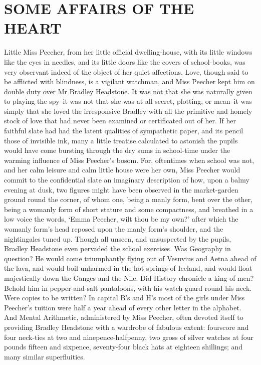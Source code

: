 
\chapter{SOME AFFAIRS OF THE HEART}

Little Miss Peecher, from her little official dwelling-house, with its
little windows like the eyes in needles, and its little doors like the
covers of school-books, was very observant indeed of the object of her
quiet affections. Love, though said to be afflicted with blindness, is
a vigilant watchman, and Miss Peecher kept him on double duty over Mr
Bradley Headstone. It was not that she was naturally given to playing
the spy--it was not that she was at all secret, plotting, or mean--it
was simply that she loved the irresponsive Bradley with all the
primitive and homely stock of love that had never been examined or
certificated out of her. If her faithful slate had had the latent
qualities of sympathetic paper, and its pencil those of invisible ink,
many a little treatise calculated to astonish the pupils would have come
bursting through the dry sums in school-time under the warming influence
of Miss Peecher’s bosom. For, oftentimes when school was not, and her
calm leisure and calm little house were her own, Miss Peecher would
commit to the confidential slate an imaginary description of how, upon
a balmy evening at dusk, two figures might have been observed in the
market-garden ground round the corner, of whom one, being a manly form,
bent over the other, being a womanly form of short stature and some
compactness, and breathed in a low voice the words, ‘Emma Peecher, wilt
thou be my own?’ after which the womanly form’s head reposed upon the
manly form’s shoulder, and the nightingales tuned up. Though all unseen,
and unsuspected by the pupils, Bradley Headstone even pervaded the
school exercises. Was Geography in question? He would come triumphantly
flying out of Vesuvius and Aetna ahead of the lava, and would boil
unharmed in the hot springs of Iceland, and would float majestically
down the Ganges and the Nile. Did History chronicle a king of men?
Behold him in pepper-and-salt pantaloons, with his watch-guard round
his neck. Were copies to be written? In capital B’s and H’s most of the
girls under Miss Peecher’s tuition were half a year ahead of every other
letter in the alphabet. And Mental Arithmetic, administered by Miss
Peecher, often devoted itself to providing Bradley Headstone with a
wardrobe of fabulous extent: fourscore and four neck-ties at two and
ninepence-halfpenny, two gross of silver watches at four pounds fifteen
and sixpence, seventy-four black hats at eighteen shillings; and many
similar superfluities.

